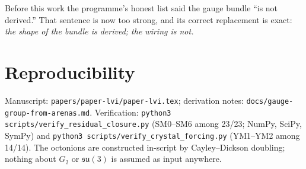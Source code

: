 \documentclass[12pt]{article}
\theoremstyle{definition}
\theoremstyle{remark}
\begin{document}
Before this work the programme's honest list said the gauge bundle ``is not derived.'' That sentence is now too strong, and its correct replacement is exact: \emph{the shape of the bundle is derived; the wiring is not.}

\section{Reproducibility}\label{sec:repro}

Manuscript: \texttt{papers/paper-lvi/paper-lvi.tex}; derivation notes: \texttt{docs/gauge-group-from-arenas.md}. Verification: \texttt{python3 scripts/verify\_residual\_closure.py} (SM0--SM6 among 23/23; NumPy, SciPy, SymPy) and \texttt{python3 scripts/verify\_crystal\_forcing.py} (YM1--YM2 among 14/14). The octonions are constructed in-script by Cayley--Dickson doubling; nothing about $G_2$ or $\mathfrak{su}(3)$ is assumed as input anywhere.



\end{document}
